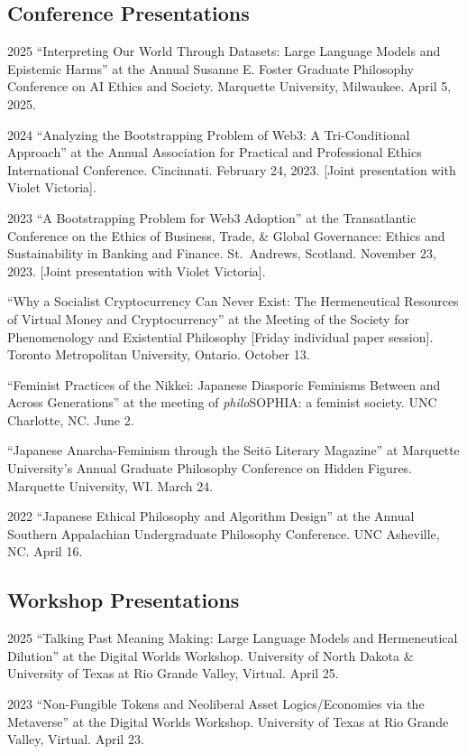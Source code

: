 \documentclass{article}
\begin{document}
\subsection*{\normalsize{Conference Presentations}}
\begin{tablist}
    \item[2025] \tab{}\enquote{Interpreting Our World Through Datasets: Large Language Models and Epistemic Harms} at the  Annual Susanne E. Foster Graduate Philosophy Conference on AI Ethics and Society. Marquette University, Milwaukee. April 5, 2025.
    \item[2024] \tab{}\enquote{Analyzing the Bootstrapping Problem of Web3: A Tri-Conditional Approach} at the  Annual Association for Practical and Professional Ethics International Conference. Cincinnati. February 24, 2023. [Joint presentation with Violet Victoria].
    \item[2023] \tab{}\enquote{A Bootstrapping Problem for Web3 Adoption} at the  Transatlantic Conference on the Ethics of Business, Trade, \& Global Governance: Ethics and Sustainability in Banking and Finance. St.~Andrews, Scotland. November 23, 2023. [Joint presentation with Violet Victoria].
    \item[] \tab{}\enquote{Why a Socialist Cryptocurrency Can Never Exist: The Hermeneutical Resources of Virtual Money and Cryptocurrency} at the  Meeting of the Society for Phenomenology and Existential Philosophy [Friday individual paper session]. Toronto Metropolitan University, Ontario. October 13.
    \item[] \tab{}\enquote{Feminist Practices of the Nikkei: Japanese Diasporic Feminisms Between and Across Generations} at the  meeting of \textit{philo}SOPHIA: a feminist society. UNC Charlotte, NC. June 2.
    \item[] \tab{}\enquote{Japanese Anarcha-Feminism through the Seitō Literary Magazine} at Marquette University's Annual Graduate Philosophy Conference on Hidden Figures. Marquette University, WI. March 24.
    \item[2022] \tab{}\enquote{Japanese Ethical Philosophy and Algorithm Design} at the  Annual Southern Appalachian Undergraduate Philosophy Conference. UNC Asheville, NC. April 16.
\end{tablist}

\subsection*{\normalsize{Workshop Presentations}}
\begin{tablist}
    \item[2025] \tab{}\enquote{Talking Past Meaning Making: Large Language Models and Hermeneutical Dilution} at the Digital Worlds Workshop. University of North Dakota \& University of Texas at Rio Grande Valley, Virtual. April 25.
    \item[2023] \tab{}\enquote{Non-Fungible Tokens and Neoliberal Asset Logics/Economies via the Metaverse} at the Digital Worlds Workshop. University of Texas at Rio Grande Valley, Virtual. April 23.
\end{tablist}
\end{document}
